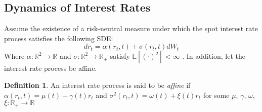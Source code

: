 \documentclass[12pt]{article}
\theoremstyle{definition}
\newtheorem{mydef}{Definition}
\theoremstyle{remark}
\begin{document}
\subsection{Dynamics of Interest Rates}
Assume the existence of a risk-neutral measure under which the spot interest rate process satisfies the following SDE:
\[dr_t=\alpha(r_t, t)+\sigma(r_t, t)dW_t\]
Where \(\alpha : \mathbb{R}^2 \to \mathbb{R}\) and \(\sigma: \mathbb{R}^2 \to \mathbb{R}_{+} \) satisfy \(\mathbb{E}[ (\cdot)^2 ] < \infty\) .  
In addition, let the interest rate process be affine.
\begin{mydef}
An interest rate process is said to be \emph{affine} if \(\alpha(r_t, t)=\mu(t)+\gamma(t) r_t\) and \(\sigma^2(r_t, t)=\omega(t)+\xi(t) r_t\) for some \(\mu \), \( \gamma \), \(\omega \), \(\xi : \mathbb{R}_{+} \to \mathbb{R}\)
\label{Definition:def1}
\end{mydef}
\end{document}
